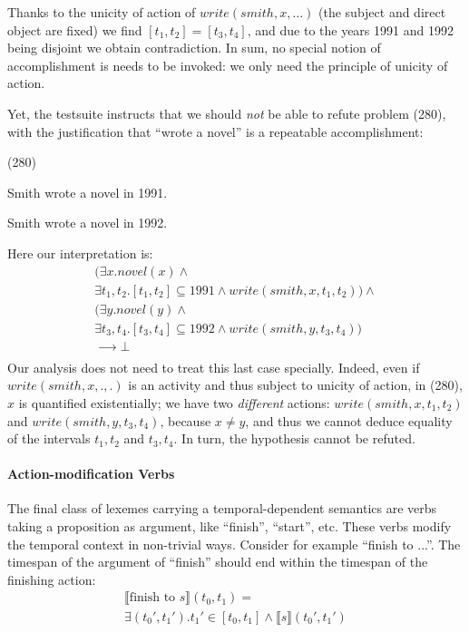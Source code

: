 \documentclass[11pt,a4paper]{article}
\newcommand\hyp{\item[H]}
\newcommand\fracasex[2]{\begin{lingex}\item[(#1)] \begin{subex} #2 \end{subex} \end{lingex} }
\begin{document}
Thanks to the unicity of action of $write(smith,x,...)$ (the subject
and direct object are fixed) we find \([t_1,t_2] = [t_3,t_4]\), and
due to the years 1991 and 1992 being disjoint we obtain contradiction. In sum, no special notion of accomplishment is needs to be invoked: we only need the principle of unicity of action.

Yet, the testsuite instructs that we should \emph{not} be able to refute
problem (280), with the justification that ``wrote a novel'' is a repeatable
accomplishment:

\fracasex{280}{
\item	Smith wrote a novel in 1991.
\hyp 	Smith wrote a novel in 1992.
}
Here our interpretation is:
\vspace{2ex}
\[\begin{array}{l}
(∃x. novel(x) ∧ \\
∃t_1,t_2. [t_1,t_2] ⊆ 1991 ∧ write(smith,x,t_1,t_2)) ∧ \\
(∃y. novel(y) ∧ \\
∃t_3,t_4. [t_3,t_4] ⊆ 1992 ∧ write(smith,y,t_3,t_4)) \\
⟶ ⊥ \\
\end{array}
\]
Our analysis does not need to treat this last case specially. Indeed,
even if $write(smith,x,.,.)$ is an activity and thus subject to
unicity of action, in (280), $x$ is quantified existentially; we have
two \emph{different} actions: $write(smith,x,t_1,t_2)$ and
$write(smith,y,t_3,t_4)$, because $x \neq y$, and thus we cannot
deduce equality of the intervals $t_1,t_2$ and $t_3,t_4$. In turn, the
hypothesis cannot be refuted.

\paragraph{Action-modification Verbs}

The final class of lexemes carrying a temporal-dependent semantics are
verbs taking a proposition as argument, like ``finish'', ``start'',
etc. These verbs modify the temporal context in non-trivial
ways. Consider for example ``finish to ...''. The timespan of the
argument of ``finish'' should end within the timespan of the finishing
action:
\vspace{-1.5ex}
\begin{multline*}
⟦\text{finish to \(s\)}⟧(t_0,t_1) = \\ ∃(t_0',t_1'). t_1' ∈ [t_0,t_1] ∧ ⟦s⟧(t_0',t_1')
\end{multline*}
\end{document}
